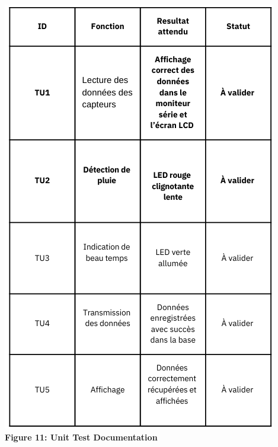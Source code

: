 \documentclass[a4paper,12pt]{article}
\begin{document}
\begin{center}
	\includegraphics[width=\textwidth]{DTU.png}\\
	\textbf{Figure 11: Unit Test Documentation}
\end{center}
\end{document}
